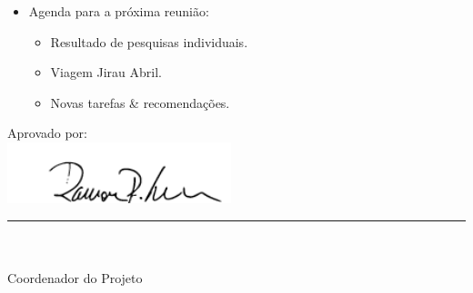 \begin{itemize}
  \item Agenda para a próxima reunião:
  \begin{itemize}
    \item Resultado de pesquisas individuais.
    \item Viagem Jirau Abril.
    \item Novas tarefas \& recomendações.
  \end{itemize}

\end{itemize}

\vspace{5mm}%
\parbox[t]{70mm}{
  Aprovado por: \\[5mm]
  \centering
  \includegraphics[width=65mm]{figs/logo/assinatura-ramon.png} \\[-4mm]
  \rule[2mm]{70mm}{0.1mm} \\
  \ramon \\[1mm]
  Coordenador do Projeto \\
}

\fim


